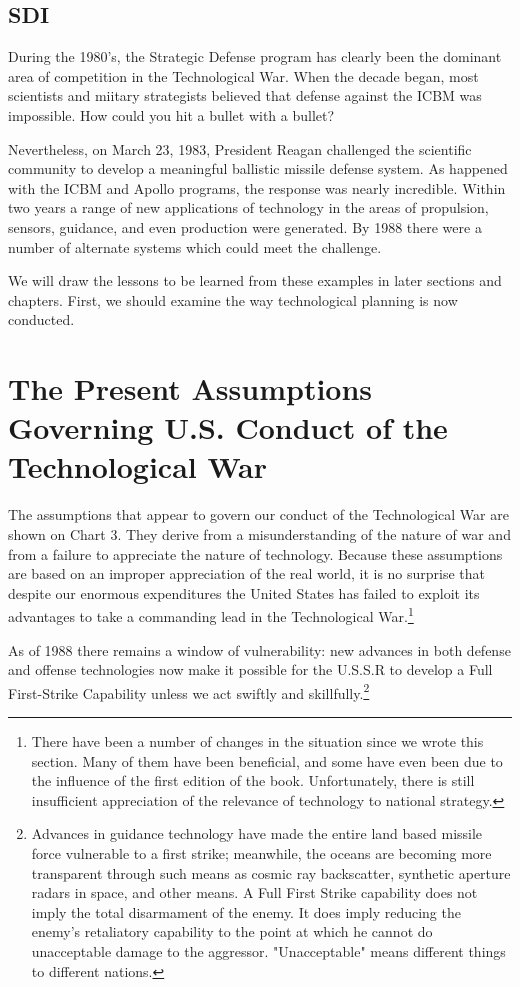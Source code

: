 \subsection{SDI}
During the 1980's, the Strategic Defense program has clearly been the dominant area of competition in the Technological War. When the decade began, most scientists and miitary strategists believed that defense against the ICBM was impossible. How could you hit a bullet with a bullet?

Nevertheless, on March 23, 1983, President Reagan challenged the scientific community to develop a meaningful ballistic missile defense system. As happened with the ICBM and Apollo programs, the response was nearly incredible. Within two years a range of new applications of technology in the areas of propulsion, sensors, guidance, and even production were generated. By 1988 there were a number of alternate systems which could meet the challenge.

We will draw the lessons to be learned from these examples in later sections and chapters. First, we should examine the way technological planning is now conducted.

\section[Present U.S. Assumptions of the Tech. War]
{The Present Assumptions Governing U.S. Conduct of the Technological War}

The assumptions that appear to govern our conduct of the Technological War are shown on Chart 3. They derive from a misunderstanding of the nature of war and from a failure to appreciate the nature of technology. Because these assumptions are based on an improper appreciation of the real world, it is no surprise that despite our enormous expenditures the United States has failed to exploit its advantages to take a commanding lead in the Technological War.\footnote{
There have been a number of changes in the situation since we wrote this section. Many of them have been beneficial, and some have even been due to the influence of the first edition of the book. Unfortunately, there is still insufficient appreciation of the relevance of technology to national strategy.
}

As of 1988 there remains a window of vulnerability: new advances in both defense and offense technologies now make it possible for the U.S.S.R to develop a Full First-Strike Capability unless we act swiftly and skillfully.\footnote{Advances in guidance technology have made the entire land based missile force vulnerable to a first strike; meanwhile, the oceans are becoming more transparent through such means as cosmic ray backscatter, synthetic aperture radars in space, and other means.
A Full First Strike capability does not imply the total disarmament of the enemy. It does imply reducing the enemy's retaliatory capability to the point at which he cannot do unacceptable damage to the aggressor. "Unacceptable" means different things to different nations.}

